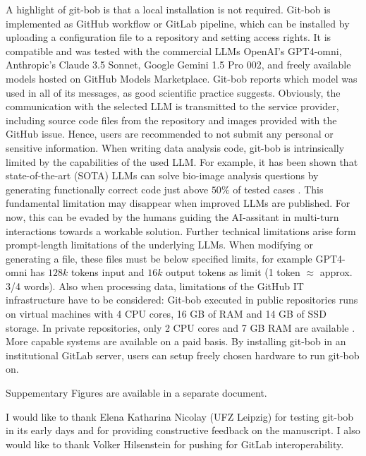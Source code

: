 \documentclass[sn-mathphys-num]{sn-jnl}%
\theoremstyle{thmstyleone}%
\theoremstyle{thmstyletwo}%
\theoremstyle{thmstylethree}%
\begin{document}
A highlight of git-bob is that a local installation is not required. Git-bob is implemented as GitHub workflow or GitLab pipeline, which can be installed by uploading a configuration file to a repository and setting access rights. It is compatible and was tested with the commercial LLMs OpenAI's GPT4-omni, Anthropic's Claude 3.5 Sonnet, Google Gemini 1.5 Pro 002, and freely available models hosted on GitHub Models Marketplace. Git-bob reports which model was used in all of its messages, as good scientific practice suggests. Obviously, the communication with the selected LLM is transmitted to the service provider, including source code files from the repository and images provided with the GitHub issue. Hence, users are recommended to not submit any personal or sensitive information. When writing data analysis code, git-bob is intrinsically limited by the capabilities of the used LLM. For example, it has been shown that state-of-the-art (SOTA) LLMs can solve bio-image analysis questions by generating functionally correct code just above $50\%$ of tested cases \cite{benchmark_llm_bia}. This fundamental limitation may disappear when improved LLMs are published. For now, this can be evaded by the humans guiding the AI-assitant in multi-turn interactions towards a workable solution. Further technical limitations arise form prompt-length limitations of the underlying LLMs. When modifying or generating a file, these files must be below specified limits, for example GPT4-omni has $128k$ tokens input and $16k$ output tokens as limit (1 token $\approx$ approx. 3/4 words). Also when processing data, limitations of the GitHub IT infrastructure have to be considered: Git-bob executed in public repositories runs on virtual machines with 4 CPU cores, 16 GB of RAM and 14 GB of SSD storage. In private repositories, only 2 CPU cores and 7 GB RAM are available \cite{github_actions_runners_2024}. More capable systems are available on a paid basis. By installing git-bob in an institutional GitLab server, users can setup freely chosen hardware to run git-bob on.


\backmatter


Suppementary Figures are available in a separate document.


I would like to thank Elena Katharina Nicolay (UFZ Leipzig) for testing git-bob in its early days and for providing constructive feedback on the manuscript. I also would like to thank Volker Hilsenstein for pushing for GitLab interoperability. 
\end{document}
